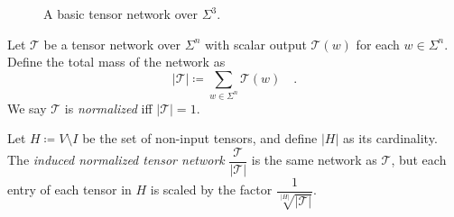 \documentclass[../../main.tex]{subfiles}
\begin{document}
    \begin{figure}[h]
    \center
    \caption{A basic tensor network over $\Sigma^3$.}
    \end{figure}


    \bigskip
    \begin{definition}
        Let $\mathcal{T}$ be a tensor network over $\Sigma^n$ with scalar output $\mathcal{T}(w)$ for each $w \in \Sigma^n$. Define the total mass of the network as
        \[
            |\mathcal{T}| \coloneqq \sum_{w \in \Sigma^n} \mathcal{T}(w) \quad .
        \]
        We say $\mathcal{T}$ is \emph{normalized} iff $|\mathcal{T}| = 1$.

        Let $H \coloneqq V \setminus I$ be the set of non-input tensors, and define $|H|$ as its cardinality. The \emph{induced normalized tensor network} $\dfrac{\mathcal{T}}{|\mathcal{T}|}$ is the same network as $\mathcal{T}$, but each entry of each tensor in $H$ is scaled by the factor $\dfrac{1}{\sqrt[|H|]{|\mathcal{T}|}}$.
    \end{definition}
\end{document}
